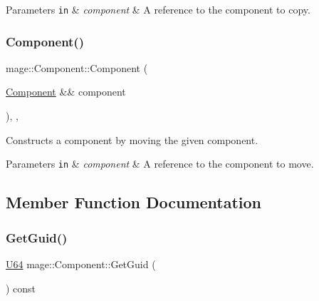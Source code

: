 \begin{DoxyParams}[1]{Parameters}
\mbox{\tt in}  & {\em component} & A reference to the component to copy. \\
\hline
\end{DoxyParams}
\hypertarget{classmage_1_1_component_a3abb21d27d4e89513787396c27b0ff6d}{}\label{classmage_1_1_component_a3abb21d27d4e89513787396c27b0ff6d} 
\subsubsection{\texorpdfstring{Component()}{Component()}\hspace{0.1cm}{\footnotesize\ttfamily [3/3]}}
{\footnotesize\ttfamily mage\+::\+Component\+::\+Component (\begin{DoxyParamCaption}\item[{\hyperlink{classmage_1_1_component}{Component} \&\&}]{component }\end{DoxyParamCaption})\hspace{0.3cm}{\ttfamily [protected]}, {\ttfamily [default]}, {\ttfamily [noexcept]}}

Constructs a component by moving the given component.


\begin{DoxyParams}[1]{Parameters}
\mbox{\tt in}  & {\em component} & A reference to the component to move. \\
\hline
\end{DoxyParams}


\subsection{Member Function Documentation}
\hypertarget{classmage_1_1_component_a1af8d5d8d09e5de54851ebed22153571}{}\label{classmage_1_1_component_a1af8d5d8d09e5de54851ebed22153571} 
\subsubsection{\texorpdfstring{Get\+Guid()}{GetGuid()}}
{\footnotesize\ttfamily \hyperlink{namespacemage_a6672cf3c861707ce4a3235a3eb43941d}{U64} mage\+::\+Component\+::\+Get\+Guid (\begin{DoxyParamCaption}{ }\end{DoxyParamCaption}) const\hspace{0.3cm}{\ttfamily [noexcept]}}

